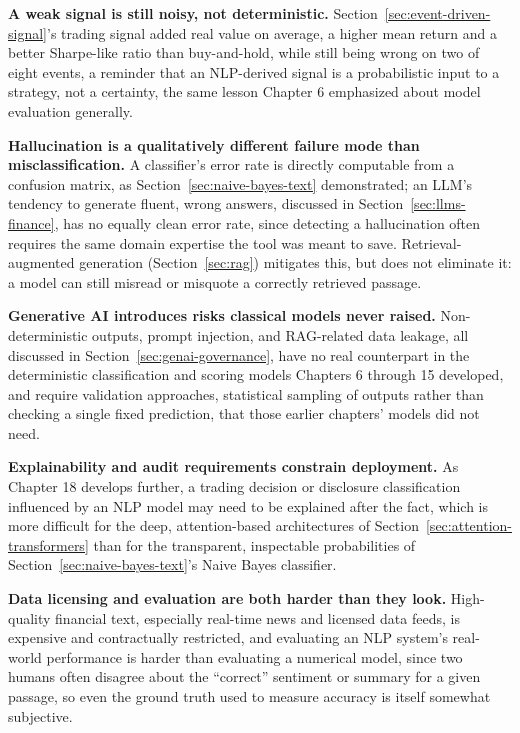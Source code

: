 \documentclass[../ai_in_finance]{subfiles}
\begin{document}
\textbf{A weak signal is still noisy, not deterministic.} Section~\ref{sec:event-driven-signal}'s trading signal added real value on average, a higher mean return and a better Sharpe-like ratio than buy-and-hold, while still being wrong on two of eight events, a reminder that an NLP-derived signal is a probabilistic input to a strategy, not a certainty, the same lesson Chapter 6 emphasized about model evaluation generally.

\textbf{Hallucination is a qualitatively different failure mode than misclassification.} A classifier's error rate is directly computable from a confusion matrix, as Section~\ref{sec:naive-bayes-text} demonstrated; an LLM's tendency to generate fluent, wrong answers, discussed in Section~\ref{sec:llms-finance}, has no equally clean error rate, since detecting a hallucination often requires the same domain expertise the tool was meant to save. Retrieval-augmented generation (Section~\ref{sec:rag}) mitigates this, but does not eliminate it: a model can still misread or misquote a correctly retrieved passage.

\textbf{Generative AI introduces risks classical models never raised.} Non-deterministic outputs, prompt injection, and RAG-related data leakage, all discussed in Section~\ref{sec:genai-governance}, have no real counterpart in the deterministic classification and scoring models Chapters 6 through 15 developed, and require validation approaches, statistical sampling of outputs rather than checking a single fixed prediction, that those earlier chapters' models did not need.

\textbf{Explainability and audit requirements constrain deployment.} As Chapter 18 develops further, a trading decision or disclosure classification influenced by an NLP model may need to be explained after the fact, which is more difficult for the deep, attention-based architectures of Section~\ref{sec:attention-transformers} than for the transparent, inspectable probabilities of Section~\ref{sec:naive-bayes-text}'s Naive Bayes classifier.

\textbf{Data licensing and evaluation are both harder than they look.} High-quality financial text, especially real-time news and licensed data feeds, is expensive and contractually restricted, and evaluating an NLP system's real-world performance is harder than evaluating a numerical model, since two humans often disagree about the ``correct'' sentiment or summary for a given passage, so even the ground truth used to measure accuracy is itself somewhat subjective.
\end{document}
